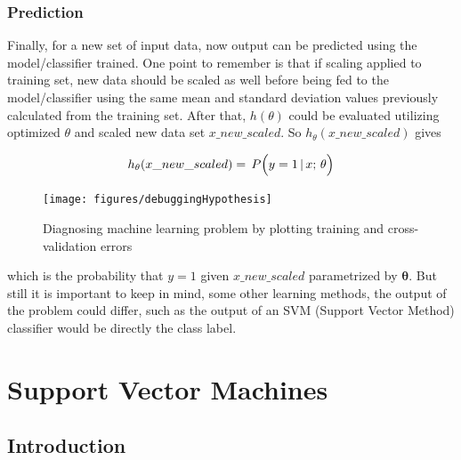 \subsubsection{Prediction}

Finally, for a new set of input data, now output can be predicted using the model/classifier trained. 
One point to remember is that if scaling applied to training set, new data should be scaled as well before being fed to the model/classifier using the same mean and standard deviation values previously calculated from the training set. 
After that, $h(\theta)$ could be evaluated utilizing optimized $\theta$ and scaled new data set $x\_new\_scaled$. 
So $h_\theta(x\_new\_scaled)$ gives

\begin{equation}{\label{eqn:prediction}
h_{\theta}(x\_new\_scaled})
=\,
P\Big(y=1 \, | \, x; \, \theta \Big)
\end{equation} 

\begin{landscape}
\begin{figure}
\begin{center}
\texttt{[image: figures/debuggingHypothesis]}    %
\caption{Diagnosing machine learning problem by plotting training and cross-validation errors} 
\label{fig:debuggingHypothesis}
\end{center}
\end{figure}
\end{landscape}

which is the probability that $y = 1$ given $x\_new\_scaled$ parametrized by $\bm{\theta}$. 
But still it is important to keep in mind, some other learning methods, the output of the problem could differ, such as the output of an SVM (Support Vector Method) classifier would be directly the class label.



\section{Support Vector Machines}

\subsection{Introduction}


